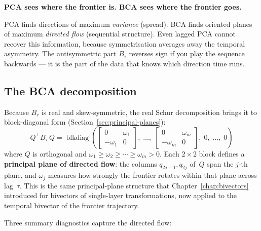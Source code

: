\documentclass[11pt, twoside, openright]{memoir}
\numberwithin{equation}{chapter}
\begin{document}
\begin{keyidea}
\textbf{PCA sees where the frontier is.  BCA sees where the
frontier goes.}

PCA finds directions of maximum \emph{variance} (spread).  BCA
finds oriented planes of maximum \emph{directed flow} (sequential
structure).  Even lagged PCA cannot recover this information,
because symmetrisation averages away the temporal asymmetry.  The
antisymmetric part $B_\tau$ reverses sign if you play the sequence
backwards --- it is the part of the data that knows which direction
time runs.
\end{keyidea}

\subsection*{The BCA decomposition}

Because $B_\tau$ is real and skew-symmetric, the real Schur
decomposition brings it to block-diagonal form
(Section~\ref{sec:principal-planes}):
\begin{equation}\label{eq:bca-schur}
  Q^\top B_\tau\, Q = \operatorname{blkdiag}\!\left(
    \begin{bmatrix} 0 & \omega_1 \\ -\omega_1 & 0 \end{bmatrix},
    \;\ldots,\;
    \begin{bmatrix} 0 & \omega_m \\ -\omega_m & 0 \end{bmatrix},
    \;0,\;\ldots,\;0
  \right)
\end{equation}
where $Q$ is orthogonal and $\omega_1 \geq \omega_2 \geq \cdots
\geq \omega_m > 0$.  Each $2\times2$ block defines a
\textbf{principal plane of directed flow}: the columns
$q_{2j-1}, q_{2j}$ of~$Q$ span the $j$-th plane, and $\omega_j$
measures how strongly the frontier rotates within that plane across
lag~$\tau$.  This is the same principal-plane structure that
Chapter~\ref{chap:bivectors} introduced for bivectors of single-layer
transformations, now applied to the temporal bivector of the frontier
trajectory.

Three summary diagnostics capture the directed flow:
\end{document}
